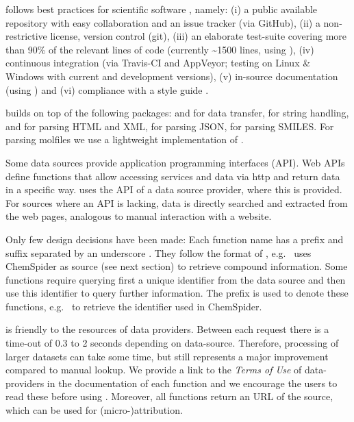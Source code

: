\documentclass[article, shortnames]{jss}\usepackage[]{graphicx}\usepackage[]{color}
\providecommand{\DIFaddbegin}{} %
\providecommand{\DIFaddend}{} %
\begin{document}
 follows best practices for scientific software \citep{wilson_best_2014, poisot_best_2015}, namely: (i) a public available repository with easy collaboration and an issue tracker (via GitHub), (ii) a non-restrictive license, version control (git), (iii) an elaborate test-suite covering more than 90\% of the relevant lines of code (currently \textasciitilde 1500 lines, using  \citep{wickham_testthat:_2011}), (iv) continuous integration (via Travis-CI and AppVeyor; testing on Linux \& Windows with current and development  versions), (v) in-source documentation (using  \citep{wickham_roxygen2:_2015}) and (vi) compliance with a style guide \citep{wickham_advanced_2015}.

 builds on top of the following  packages:
 \citep{lang_rcurl:_2015} and  \citep{wickham_httr} for data transfer,
 \citep{wickham_stringr:_2015} for string handling,
 \citep{wickham_xml2} and  \citep{wickham_rvest} for parsing HTML and XML,
 \citep{ooms_jsonlite_2014} for parsing JSON,
 \citep{guha_rcdk} for parsing SMILES.
For parsing molfiles we use a lightweight implementation of \citep{Grabner_Varmuza_Dehmer_2012}.

Some data sources provide application programming interfaces (API).
Web APIs define functions that allow accessing services and data via http and return data in a specific way.
 uses the API of a data source provider, where this is provided.
For sources where an API is lacking, data is directly searched and extracted from the web pages, analogous to manual interaction with a website.

Only few design decisions have been made:
Each function name has a prefix and suffix separated by an underscore \citep{Chamberlain_Szocs_2013}.
They follow the format of , e.g.\DIFaddbegin \ \DIFaddend {} uses ChemSpider as source (see next section) to retrieve compound information.
Some functions require querying first a unique identifier from the data source and then use this identifier to query further information.
The prefix  is used to denote these functions, e.g.\DIFaddbegin \ \DIFaddend {} to retrieve the identifier used in ChemSpider.

 is friendly to the resources of data providers. 
Between each request there is a time-out of 0.3 to 2 seconds depending on data-source. 
Therefore, processing of larger datasets can take some time, but still represents a major improvement compared to manual lookup.
We provide a link to the \emph{Terms of Use} of data-providers in the documentation of each function and we encourage the users to read these before using .
Moreover, all functions return an URL of the source, which can be used for \mbox{(micro-)attribution}.
\end{document}
